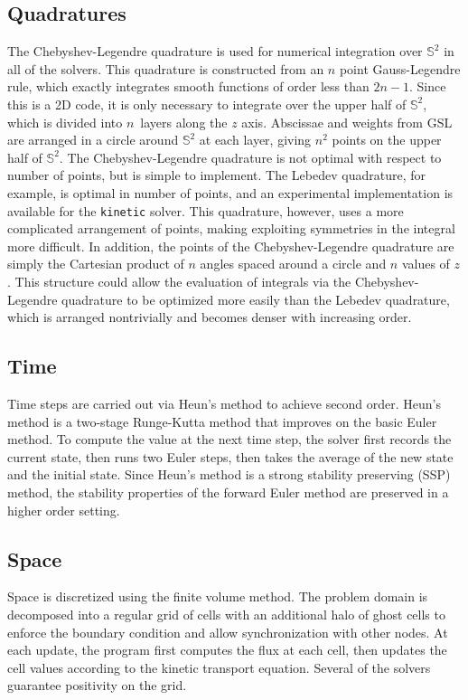 \documentclass{article}
\newcommand{\twosphere}{\ensuremath{\mathbb{S}^2}\xspace}
\newcommand{\kinetic}{\texttt{kinetic}\xspace}
\begin{document}
\subsection{Quadratures}
\label{subsec:quadratures}
The Chebyshev-Legendre quadrature is used for numerical integration over
\twosphere in all of the solvers. This quadrature is constructed from an
$n$ point Gauss-Legendre rule, which exactly integrates smooth functions of
order less than $2n-1$. Since this is a 2D code, it is only necessary
to integrate over the upper half of \twosphere, which is divided into
$n$~layers along the $z$ axis. Abscissae and weights from GSL are arranged
in a circle around \twosphere at each layer, giving $n^2$ points on the
upper half of \twosphere. The Chebyshev-Legendre quadrature is not optimal
with respect to number of points, but is simple to implement. The Lebedev
quadrature, for example, is optimal in number of points, and an experimental
implementation is available for the \kinetic solver. This quadrature, however,
uses a more complicated arrangement of points, making exploiting symmetries
in the integral more difficult. In addition, the points of the
Chebyshev-Legendre quadrature are simply the Cartesian product of $n$ angles
spaced around a circle and $n$ values of $z$. This structure could allow the
evaluation of integrals via the Chebyshev-Legendre quadrature to be optimized
more easily than the Lebedev quadrature, which is arranged nontrivially and
becomes denser with increasing order.

\subsection{Time}
Time steps are carried out via Heun's method to achieve second order.
Heun's method is a two-stage Runge-Kutta method that improves on the
basic Euler method. To compute the value at the next time step, the solver
first records the current state, then runs two Euler steps, then takes the
average of the new state and the initial state. Since Heun's method is a
strong stability preserving (SSP) method, the stability properties of
the forward Euler method are preserved in a higher order setting.

\subsection{Space}
Space is discretized using the finite volume method. The problem domain is
decomposed into a regular grid of cells with an additional halo of ghost cells
to enforce the boundary condition and allow synchronization with other nodes.
At each update, the program first computes the flux at each cell, then updates
the cell values according to the kinetic transport equation. Several of the
solvers guarantee positivity on the grid.
\end{document}
